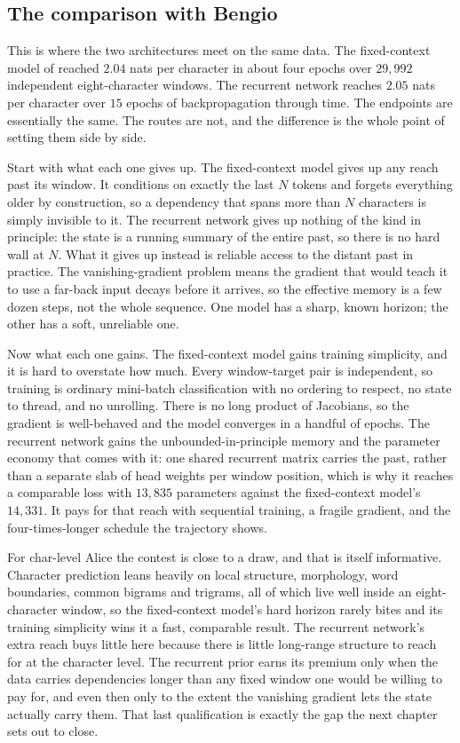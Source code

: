 \subsection*{The comparison with Bengio}

This is where the two architectures meet on the same data. The
fixed-context model of  reached $2.04$ nats per
character in about four epochs over $29{,}992$ independent eight-character
windows. The recurrent network reaches $2.05$ nats per character over
$15$ epochs of backpropagation through time. The endpoints are essentially
the same. The routes are not, and the difference is the whole point of
setting them side by side.

Start with what each one gives up. The fixed-context model gives up any
reach past its window. It conditions on exactly the last $N$ tokens and
forgets everything older by construction, so a dependency that spans more
than $N$ characters is simply invisible to it. The recurrent network gives
up nothing of the kind in principle: the state is a running summary of the
entire past, so there is no hard wall at $N$. What it gives up instead is
reliable access to the distant past in practice. The
vanishing-gradient problem means the gradient that would teach it to use a
far-back input decays before it arrives, so the effective memory is a few
dozen steps, not the whole sequence. One model has a sharp, known horizon;
the other has a soft, unreliable one.

Now what each one gains. The fixed-context model gains training simplicity,
and it is hard to overstate how much. Every window-target pair is
independent, so training is ordinary mini-batch classification with no
ordering to respect, no state to thread, and no unrolling. There is no long
product of Jacobians, so the gradient is well-behaved and the model converges
in a handful of epochs. The recurrent network gains the unbounded-in-principle
memory and the parameter economy that comes with it: one shared recurrent
matrix carries the past, rather than a separate slab of head weights per
window position, which is why it reaches a comparable loss with $13{,}835$
parameters against the fixed-context model's $14{,}331$. It pays for that
reach with sequential training, a fragile gradient, and the four-times-longer
schedule the trajectory shows.

For char-level Alice the contest is close to a draw, and that is itself
informative. Character prediction leans heavily on local structure,
morphology, word boundaries, common bigrams and trigrams, all of which live
well inside an eight-character window, so the fixed-context model's hard
horizon rarely bites and its training simplicity wins it a fast,
comparable result. The recurrent network's extra reach buys little here
because there is little long-range structure to reach for at the character
level. The recurrent prior earns its premium only when the data carries
dependencies longer than any fixed window one would be willing to pay for,
and even then only to the extent the vanishing gradient lets the state
actually carry them. That last qualification is exactly the gap the next
chapter sets out to close.
